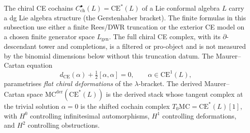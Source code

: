 The chiral CE cochains $C^\bullet_{\mathrm{ch}}(L) = \mathrm{CE}^*(L)$ of a Lie conformal algebra $L$ carry a dg Lie algebra structure (the Gerstenhaber bracket). The finite formulas in this subsection use either a finite Rees/DWR truncation or the exterior CE model on a chosen finite generator space \(L_{\mathrm{gen}}\). The full chiral CE complex, with its \(\partial\)-descendant tower and completions, is a filtered or pro-object and is not measured by the binomial dimensions below without this truncation datum. The Maurer--Cartan equation
\begin{equation}\label{eq:mc-chiral-ce}
 d_{\mathrm{CE}}(\alpha) + \tfrac{1}{2}[\alpha, \alpha] = 0, \qquad \alpha \in \mathrm{CE}^1(L),
\end{equation}
parametrises \emph{flat chiral deformations} of the $\lambda$-bracket. The derived Maurer--Cartan space $\mathrm{MC}^{\mathrm{der}}(\mathrm{CE}^{*}(L))$ is the derived stack whose tangent complex at the trivial solution $\alpha = 0$ is the shifted cochain complex $T_0\mathrm{MC} = \mathrm{CE}^{*}(L)[1]$, with $H^0$ controlling infinitesimal automorphisms, $H^1$ controlling deformations, and $H^2$ controlling obstructions.

